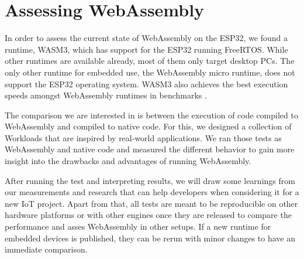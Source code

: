 \section*{Assessing WebAssembly}

In order to assess the current state of WebAssembly on the ESP32, we found a runtime, WASM3, which has support for the ESP32 running FreeRTOS. While other runtimes are available already, most of them only target desktop PCs. The only other runtime for embedded use, the WebAssembly micro runtime, does not support the ESP32 operating system. WASM3 also achieves the best execution speeds amongst WebAssembly runtimes in benchmarks \autocite{shymanskyy_wasm3_2020}.

The comparison we are interested in is between the execution of code compiled to WebAssembly and compiled to native code. For this, we designed a collection of Workloads that are inspired by real-world applications. We ran those tests as WebAssembly and native code and measured the different behavior to gain more insight into the drawbacks and advantages of running WebAssembly.

After running the test and interpreting results, we will draw some learnings from our measurements and research that can help developers when considering it for a new IoT project. Apart from that, all tests are meant to be reproducible on other hardware platforms or with other engines once they are released to compare the performance and asses WebAssembly in other setups. If a new runtime for embedded devices is published, they can be rerun with minor changes to have an immediate comparison.